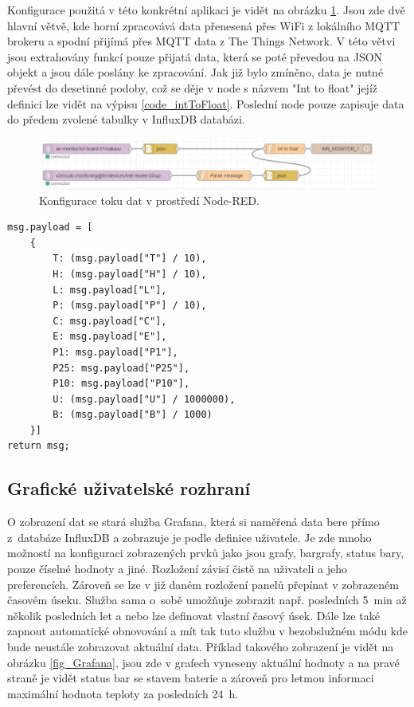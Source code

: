 Konfigurace použitá v této konkrétní aplikaci je vidět na obrázku \ref{fig_NodeRED}. Jsou zde dvě hlavní větvě, kde horní zpracovává data přenesená přes WiFi z lokálního MQTT brokeru a spodní přijímá přes MQTT data z The Things Network. V této větvi jsou extrahovány funkcí pouze přijatá data, která se poté převedou na JSON objekt a jsou dále poslány ke zpracování. Jak již bylo zmíněno, data je nutné převést do desetinné podoby, což se děje v node s názvem "Int to float" jejíž definici lze vidět na výpisu \ref{code_intToFloat}. Poslední node pouze zapisuje data do předem zvolené tabulky v InfluxDB databázi.

\begin{figure}[h]
    \centering
    \includegraphics[width=\textwidth]{obrazky/nodered.png}
    \caption{Konfigurace toku dat v prostředí Node-RED.}
    \label{fig_NodeRED}
\end{figure}

\noindent
\begin{minipage}{\linewidth}
\begin{lstlisting}[caption={Funkce pro převod naměřených dat do desetinné podoby.}, label={code_intToFloat}]
msg.payload = [
    {
        T: (msg.payload["T"] / 10),
        H: (msg.payload["H"] / 10),
        L: msg.payload["L"],
        P: (msg.payload["P"] / 10),
        C: msg.payload["C"],
        E: msg.payload["E"],
        P1: msg.payload["P1"],
        P25: msg.payload["P25"],
        P10: msg.payload["P10"],
        U: (msg.payload["U"] / 1000000),
        B: (msg.payload["B"] / 1000)
    }]
return msg;
\end{lstlisting}
\end{minipage}

\subsection{Grafické uživatelské rozhraní}

O zobrazení dat se stará služba Grafana, která si naměřená data bere přímo z~databáze InfluxDB a zobrazuje je podle definice uživatele. Je zde mnoho možností na konfiguraci zobrazených prvků jako jsou grafy, bargrafy, status bary, pouze číselné hodnoty a jiné. Rozložení závisí čistě na uživateli a jeho preferencích. Zároveň se lze v již daném rozložení panelů přepínat v zobrazeném časovém úseku. Služba sama o~sobě umožňuje zobrazit např. posledních \SI{5}{\minute} až několik posledních let a nebo lze definovat vlastní časový úsek. Dále lze také zapnout automatické obnovování a mít tak tuto službu v bezobslužném módu kde bude neustále zobrazovat aktuální data. Příklad takového zobrazení je vidět na obrázku \ref{fig_Grafana}, jsou zde v grafech vyneseny aktuální hodnoty a na pravé straně je vidět status bar se stavem baterie a zároveň pro letmou informaci maximální hodnota teploty za posledních \SI{24}{\hour}.

